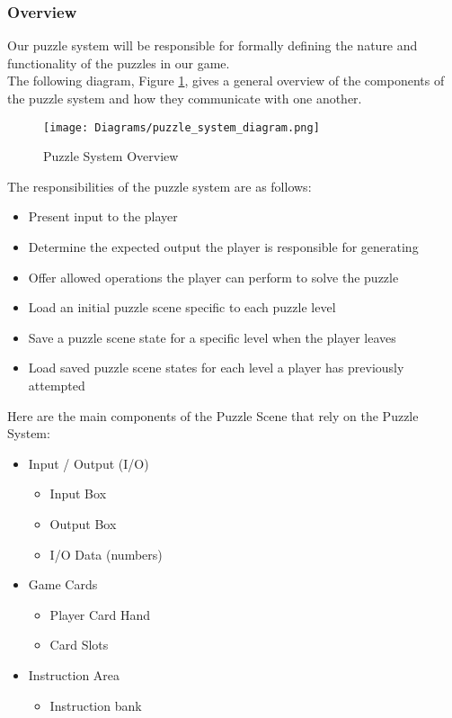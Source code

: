 \subsubsection{Overview}
Our puzzle system will be responsible for formally defining the nature and
functionality of the puzzles in our game.\\

The following diagram, Figure \ref{fig:puzzle_system_diagram}, gives a general overview 
of the components of the puzzle system and how they communicate with one another.

\begin{figure}[!hb]
  \caption{Puzzle System Overview}
  \label{fig:puzzle_system_diagram}
  \centering
  \texttt{[image: Diagrams/puzzle\_system\_diagram.png]}
\end{figure}
\vfill
\clearpage

The responsibilities of the puzzle system are as follows:

\begin{itemize}
	\item Present input to the player
	\item Determine the expected output the player is responsible for generating
	\item Offer allowed operations the player can perform to solve the puzzle
	\item Load an initial puzzle scene specific to each puzzle level
	\item Save a puzzle scene state for a specific level when the player leaves
	\item Load saved puzzle scene states for each level a player has previously attempted
\end{itemize}

Here are the main components of the Puzzle Scene that rely on the Puzzle System:

\begin{itemize}
	\item Input / Output (I/O)
	\begin{itemize}
		\item Input Box
		\item Output Box
		\item I/O Data (numbers)
	\end{itemize}

	\item Game Cards
	\begin{itemize}
		\item Player Card Hand
		\item Card Slots
	\end{itemize}

	\item Instruction Area
	\begin{itemize}
		\item Instruction bank
	\end{itemize}
\end{itemize}

